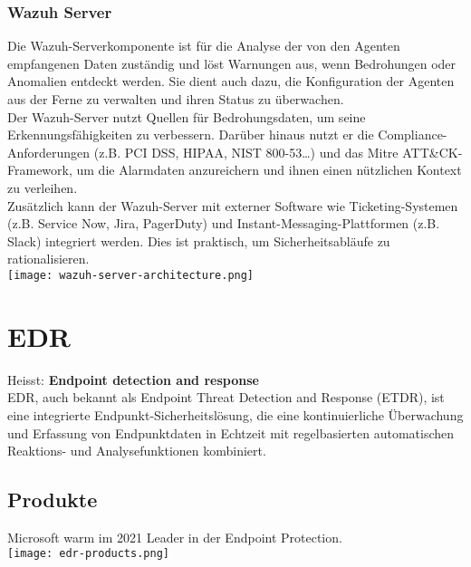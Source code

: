 \subsubsection{Wazuh Server}
Die Wazuh-Serverkomponente ist für die Analyse der von den Agenten empfangenen Daten zuständig und löst Warnungen aus, wenn Bedrohungen oder Anomalien entdeckt werden.
Sie dient auch dazu, die Konfiguration der Agenten aus der Ferne zu verwalten und ihren Status zu überwachen.\\

Der Wazuh-Server nutzt Quellen für Bedrohungsdaten, um seine Erkennungsfähigkeiten zu verbessern.
Darüber hinaus nutzt er die Compliance-Anforderungen (z.B. PCI DSS, HIPAA, NIST 800-53\dots) und das Mitre ATT\&CK-Framework, um die Alarmdaten anzureichern und ihnen einen nützlichen Kontext zu verleihen.\\

Zusätzlich kann der Wazuh-Server mit externer Software wie Ticketing-Systemen (z.B. Service Now, Jira, PagerDuty) und Instant-Messaging-Plattformen (z.B. Slack) integriert werden. 
Dies ist praktisch, um Sicherheitsabläufe zu rationalisieren.\\

\texttt{[image: wazuh-server-architecture.png]}

\section{EDR}
Heisst: \textbf{Endpoint detection and response}\\

EDR, auch bekannt als Endpoint Threat Detection and Response (ETDR), ist eine integrierte Endpunkt-Sicherheitslösung, die eine kontinuierliche Überwachung und Erfassung von Endpunktdaten in Echtzeit mit regelbasierten automatischen Reaktions- und Analysefunktionen kombiniert.

\subsection{Produkte}
Microsoft warm im 2021 Leader in der Endpoint Protection.\\
\texttt{[image: edr-products.png]}